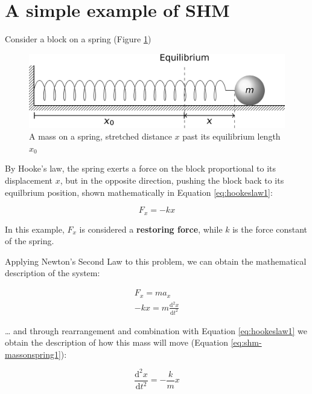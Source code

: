 \documentclass[
]{book}
\begin{document}
\hypertarget{sec-ch1-simpleshmexample}{%
\section{A simple example of SHM}\label{sec-ch1-simpleshmexample}}

Consider a block on a spring (Figure \ref{fig:ch1-blockonspring1})

\begin{figure}

{\centering \includegraphics[width=0.7\linewidth]{visualisations/LaTeX/ch1-blockonspring1} 

}

\caption{A mass on a spring, stretched distance $x$ past its equilibrium length $x_0$}\label{fig:ch1-blockonspring1}
\end{figure}

By Hooke's law, the spring exerts a force on the block proportional to its displacement \(x\), but in the opposite direction, pushing the block back to its equilbrium position, shown mathematically in Equation \eqref{eq:hookeslaw1}:

\begin{equation}
F_x = -kx
\label{eq:hookeslaw1}
\end{equation}

In this example, \(F_x\) is considered a \textbf{restoring force}, while \(k\) is the force constant of the spring.

Applying Newton's Second Law to this problem, we can obtain the mathematical description of the system:

\begin{equation}
\begin{aligned}
F_x = ma_x \\
-kx = m\frac{\textrm{d}^2 x}{\textrm{d} t^2}
\end{aligned}
\end{equation}

\ldots{} and through rearrangement and combination with Equation \eqref{eq:hookeslaw1} we obtain the description of how this mass will move (Equation \eqref{eq:shm-massonspring1}):

\begin{equation}
\frac{\textrm{d}^2 x}{\textrm{d} t^2} = -\frac{k}{m}x
\label{eq:shm-massonspring1}
\end{equation}
\end{document}
